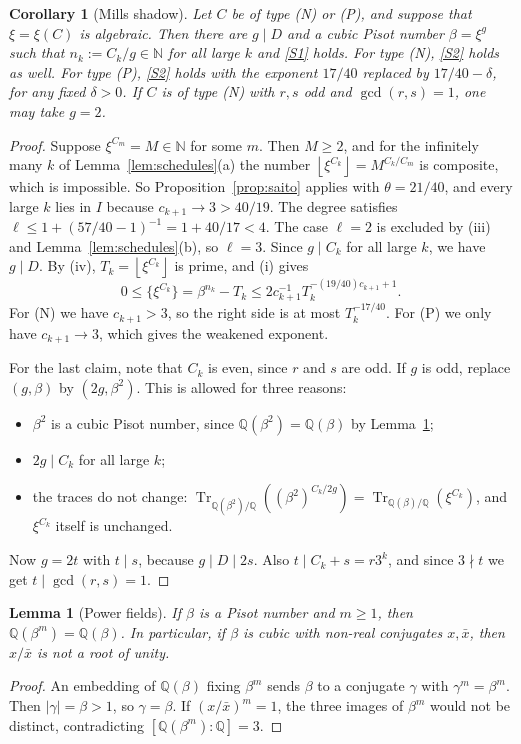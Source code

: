 \documentclass[11pt,a4paper]{article}
\newtheorem{lemma}[theorem]{Lemma}
\newtheorem{corollary}[theorem]{Corollary}
\theoremstyle{definition}
\theoremstyle{remark}
\newcommand{\Q}{\mathbb{Q}}
\newcommand{\N}{\mathbb{N}}
\DeclareMathOperator{\Tr}{Tr}
\newcommand{\floor}[1]{\left\lfloor #1\right\rfloor}
\begin{document}
\begin{corollary}[Mills shadow]\label{cor:shadow}
Let $C$ be of type \textup{(N)} or \textup{(P)}, and suppose that $\xi=\xi(C)$ is algebraic.
Then there are $g\mid D$ and a cubic Pisot number $\beta=\xi^g$ such that $n_k:=C_k/g\in\N$ for all large $k$ and \ref{S1} holds.
For type \textup{(N)}, \ref{S2} holds as well. For type \textup{(P)}, \ref{S2} holds with the exponent $17/40$ replaced by $17/40-\delta$, for any fixed $\delta>0$.
If $C$ is of type \textup{(N)} with $r,s$ odd and $\gcd(r,s)=1$, one may take $g=2$.
\end{corollary}
\begin{proof}
Suppose $\xi^{C_m}=M\in\N$ for some $m$. Then $M\ge2$, and for the infinitely many $k$ of Lemma~\ref{lem:schedules}(a) the number $\floor{\xi^{C_k}}=M^{C_k/C_m}$ is composite, which is impossible.
So Proposition~\ref{prop:saito} applies with $\theta=21/40$, and every large $k$ lies in $I$ because $c_{k+1}\to3>40/19$.
The degree satisfies $\ell\le 1+(57/40-1)^{-1}=1+40/17<4$. The case $\ell=2$ is excluded by (iii) and Lemma~\ref{lem:schedules}(b), so $\ell=3$.
Since $g\mid C_k$ for all large $k$, we have $g\mid D$.
By (iv), $T_k=\floor{\xi^{C_k}}$ is prime, and (i) gives
\[
0\le\{\xi^{C_k}\}=\beta^{n_k}-T_k\le 2c_{k+1}^{-1}T_k^{-(19/40)c_{k+1}+1}.
\]
For (N) we have $c_{k+1}>3$, so the right side is at most $T_k^{-17/40}$. For (P) we only have $c_{k+1}\to3$, which gives the weakened exponent.

For the last claim, note that $C_k$ is even, since $r$ and $s$ are odd.
If $g$ is odd, replace $(g,\beta)$ by $(2g,\beta^2)$. This is allowed for three reasons:
\begin{itemize}
\item $\beta^2$ is a cubic Pisot number, since $\Q(\beta^2)=\Q(\beta)$ by Lemma~\ref{lem:powerfield};
\item $2g\mid C_k$ for all large $k$;
\item the traces do not change: $\Tr_{\Q(\beta^2)/\Q}((\beta^2)^{C_k/2g})=\Tr_{\Q(\beta)/\Q}(\xi^{C_k})$, and $\xi^{C_k}$ itself is unchanged.
\end{itemize}
Now $g=2t$ with $t\mid s$, because $g\mid D\mid2s$. Also $t\mid C_k+s=r3^k$, and since $3\nmid t$ we get $t\mid\gcd(r,s)=1$.
\end{proof}

\begin{lemma}[Power fields]\label{lem:powerfield}
If $\beta$ is a Pisot number and $m\ge1$, then $\Q(\beta^m)=\Q(\beta)$. In particular, if $\beta$ is cubic with non-real conjugates $x,\bar x$, then $x/\bar x$ is not a root of unity.
\end{lemma}
\begin{proof}
An embedding of $\Q(\beta)$ fixing $\beta^m$ sends $\beta$ to a conjugate $\gamma$ with $\gamma^m=\beta^m$. Then $|\gamma|=\beta>1$, so $\gamma=\beta$.
If $(x/\bar x)^m=1$, the three images of $\beta^m$ would not be distinct, contradicting $[\Q(\beta^m):\Q]=3$.
\end{proof}
\end{document}
